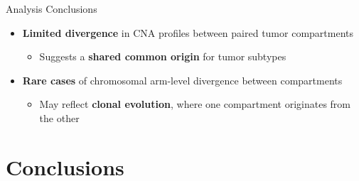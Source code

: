 \documentclass[aspectratio=169]{beamer}
\begin{document}
\begin{frame}{Analysis Conclusions}
    \begin{itemize}
        \item \textbf{Limited divergence} in CNA profiles between paired tumor compartments  
        \begin{itemize} 
            \item Suggests a \textbf{shared common origin} for tumor subtypes
        \end{itemize}
        \vspace{0.5cm}
        \item \textbf{Rare cases} of chromosomal arm-level divergence between compartments  
        \begin{itemize} 
            \item May reflect \textbf{clonal evolution}, where one compartment originates from the other
        \end{itemize}
    \end{itemize}
\end{frame}


\section{Conclusions}

\end{document}
